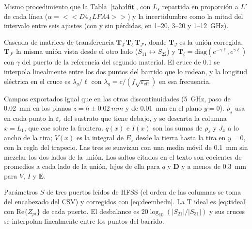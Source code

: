 \documentclass[11pt,letterpaper]{article}
\begin{document}
\begin{description}[style=nextline,leftmargin=0pt,itemsep=4pt,font=\normalfont\bfseries]
\item[Ajuste del sustrato compensado] Mismo procedimiento que la Tabla~\ref{tab:dfit}, con $L_s$ repartida en proporción a $L'$ de cada línea ($\alpha=<<D4_ALFA4>>$) y la incertidumbre como la mitad del intervalo entre seis ajustes (con y sin pérdidas, en 1--20, 3--20 y 1--\SI{12}{GHz}).

\item[Figura~\ref{fig:d4tramo} y Tabla~\ref{tab:d4tramo} (tramo finito)] Cascada de matrices de transferencia $\mathbf{T}_J\,\mathbf{T}_\ell\,\mathbf{T}_{J'}$, donde $\mathbf{T}_J$ es la unión corregida, $\mathbf{T}_{J'}$ la misma unión vista desde el otro lado ($S_{11}\leftrightarrow S_{22}$) y $\mathbf{T}_\ell=\mathrm{diag}(e^{-\gamma\ell},e^{\gamma\ell})$ con $\gamma$ del puerto de la referencia del segundo material. El cruce de 0.1 se interpola linealmente entre los dos puntos del barrido que lo rodean, y la longitud eléctrica en el cruce es $\lambda_g/\ell$ con $\lambda_g=c/(f\sqrt{\varepsilon_{\mathrm{eff}}})$ en esa frecuencia.

\item[Figura~\ref{fig:d4campos} (campos del cambio de sustrato)] Campos exportados igual que en las otras discontinuidades (\SI{5}{GHz}, paso de \SI{0.02}{mm} en los planos $z=h\pm\SI{0.02}{mm}$ y de \SI{0.01}{mm} en el plano $y=0$). $\rho_s$ usa en cada punto la $\varepsilon_r$ del sustrato que tiene debajo, y se descarta la columna $x=L_1$, que cae sobre la frontera. $q(x)$ e $I(x)$ son las sumas de $\rho_s$ y $J_x$ a lo ancho de la tira; $V(x)$ es la integral de $E_z$ desde la tierra hasta la tira en $y=0$, con la regla del trapecio. Las tres se suavizan con una media móvil de \SI{0.1}{mm} sin mezclar los dos lados de la unión. Los saltos citados en el texto son cocientes de promedios a cada lado de la unión, lejos de ella para $q$ y $\mathbf{D}$ y a menos de \SI{0.3}{mm} para $V$, $I$ y $\mathbf{E}$.

\item[Tabla~\ref{tab:d5sparam} y Figura~\ref{fig:d5t} (T de \SI{50}{\ohm})] Parámetros $S$ de tres puertos leídos de HFSS (el orden de las columnas se toma del encabezado del CSV) y corregidos con \eqref{eq:deembedn}. La T ideal es \eqref{eq:tideal} con $\mathrm{Re}\{Z_{pi}\}$ de cada puerto. El desbalance es $20\log_{10}(|S_{21}|/|S_{31}|)$ y sus cruces se interpolan linealmente entre los puntos del barrido.


\end{description}
\end{document}
